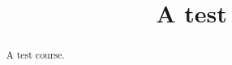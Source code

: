 \documentclass{xourse}
\title{A test}
\begin{document}
\begin{abstract}
  A test course.
\end{abstract}
\maketitle
{}
\end{document}
